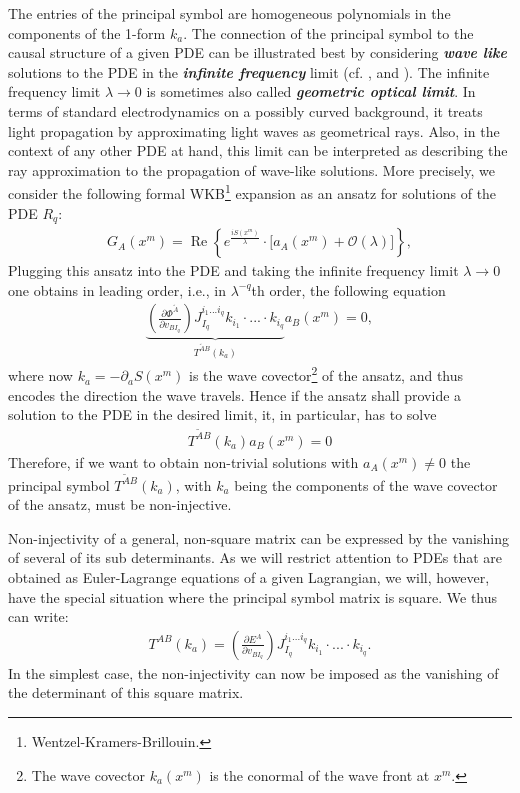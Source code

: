 The entries of the principal symbol are homogeneous polynomials in the components of the 1-form $k_a$.
The connection of the principal symbol to the causal structure of a given PDE can be illustrated best by considering \textit{\textbf{wave like}} solutions to the PDE in the \textit{\textbf{infinite frequency}} limit (cf. \cite{2012arXiv1211.1914K}, \cite{2011PhRvD..83d4047R} and \cite{2018PhRvD..97h4036D}). 
The infinite frequency limit $\lambda \rightarrow 0 $ is sometimes also called \textit{\textbf{geometric optical limit}}. In terms of standard electrodynamics on a possibly curved background, it treats light propagation by approximating light waves as geometrical rays. Also, in the context of any other PDE at hand, this limit can be interpreted as describing the ray approximation to the propagation of wave-like solutions.
More precisely, we consider the following formal WKB\footnote{Wentzel-Kramers-Brillouin.} expansion as an ansatz for solutions of the PDE $R_q$:
\begin{align}\label{waveAns}
    G_A(x^m) = \operatorname{Re}\left \{ e^{\frac{iS(x^m)}{\lambda}} \cdot   \bigl [ a_A(x^m) + \mathcal{O}(\lambda) \bigr ]\right \},
\end{align}
Plugging this ansatz into the PDE and taking the infinite frequency limit $\lambda \rightarrow 0$ one obtains in leading order, i.e., in $\lambda^{-q}$th order, the following equation
\begin{align}
    \underbrace{\left ( \frac{\partial \Phi^{\tilde{A}}}{\partial v_{BI_q}} \right ) J_{I_q}^{i_1...i_q} k_{i_1} \cdot ... \cdot k_{i_q}}_{T^{\tilde{A} B}(k_a)} a_B(x^m) = 0,
\end{align}
where now $k_a = - \partial_aS(x^m)$ is the wave covector\footnote{The wave covector $k_a(x^m)$ is the conormal of the wave front at $x^m$.} of the ansatz, and thus encodes the direction the wave travels. Hence if the ansatz shall provide a solution to the PDE in the desired limit, it, in particular, has to solve 
\begin{align}\label{solvabilityCond}
    T^{\tilde{A} B}(k_a) a_B(x^m) = 0
\end{align} 
Therefore, if we want to obtain non-trivial solutions with $a_A(x^m) \neq 0$ the principal symbol
$T^{\tilde{A} B}(k_a)$, with $k_a$ being the components of the wave covector of the ansatz, must be non-injective.

Non-injectivity of a general, non-square matrix can be expressed by the vanishing of several of its sub determinants. As we will restrict attention to PDEs that are obtained as Euler-Lagrange equations of a given Lagrangian, we will, however, have the special situation where the principal symbol matrix is square. We thus can write: 
\begin{align}
T^{A B}(k_a) =  \left ( \frac{\partial E^{A}}{\partial v_{BI_q}} \right ) J_{I_q}^{i_1...i_q} k_{i_1} \cdot ... \cdot k_{i_q}.
\end{align}
In the simplest case, the non-injectivity can now be imposed as the vanishing of the determinant of this square matrix.

